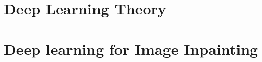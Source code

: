 \documentclass[12pt]{book}
\begin{document}
\pagestyle{fancy}

\fancyhead{}

\renewcommand{\chaptermark}[1]{\markboth{\textsc{#1}}{}}

\frontmatter



%
%


\tableofcontents
\clearpage





\setlength{\parskip}{.7em}

\titlespacing*{\section}{0pt}{.9em}{.8em}
\renewcommand{\baselinestretch}{1.1}








\mainmatter 
\fancyhead[RO]{\leftmark}
\fancyhead[LE]{\textsc{\chaptername~\thechapter}}

\part{Deep Learning Theory}\label{part:theory_background}


\part{Deep learning for Image Inpainting}\label{part:study}

\end{document}
